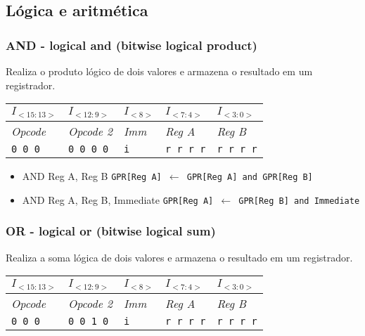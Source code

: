 \documentclass[11pt,a4paper]{report}
\begin{document}
\subsection{Lógica e aritmética}

\subsubsection{AND - logical and (bitwise logical product)}
Realiza o produto lógico de dois valores e armazena o resultado em um
registrador. 

\begin{table}[htb!]
\centering
\begin{tabular}{|p{2cm}|p{2cm}|p{2cm}|p{2cm}|p{2cm}|}
\hline
$I_{<15:13>}$ & $I_{<12:9>}$ & $I_{<8>}$ & $I_{<7:4>}$ & $I_{<3:0>}$  \\ \hline
\textit{Opcode} & \textit{Opcode 2} & \textit{Imm} & \textit{Reg A} & \textit{Reg B} \\ \hline
\texttt{0 0 0} & \texttt{0 0 0 0} & \texttt{i} & \texttt{r r r r} & \texttt{r r r r} \\ \hline
\end{tabular}
\end{table}

\begin{itemize}
\item AND Reg A, Reg B
\subitem \texttt{GPR[Reg A] $\leftarrow$ GPR[Reg A] and GPR[Reg B]}
\item AND Reg A, Reg B, Immediate
\subitem \texttt{GPR[Reg A] $\leftarrow$ GPR[Reg B] and Immediate}
\end{itemize}

\subsubsection{OR - logical or (bitwise logical sum)}
Realiza a soma lógica de dois valores e armazena o resultado em um
registrador.

\begin{table}[htb!]
\centering
\begin{tabular}{|p{2cm}|p{2cm}|p{2cm}|p{2cm}|p{2cm}|}
\hline
$I_{<15:13>}$ & $I_{<12:9>}$ & $I_{<8>}$ & $I_{<7:4>}$ & $I_{<3:0>}$  \\ \hline
\textit{Opcode} & \textit{Opcode 2} & \textit{Imm} & \textit{Reg A} & \textit{Reg B} \\ \hline
\texttt{0 0 0} & \texttt{0 0 1 0} & \texttt{i} & \texttt{r r r r} & \texttt{r r r r} \\ \hline
\end{tabular}
\end{table}
\end{document}
